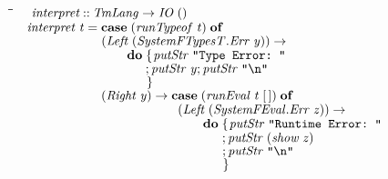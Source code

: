 \documentclass[10pt]{article}
\newlength{\lwidth}\setlength{\lwidth}{4.5cm}
\newlength{\cwidth}\setlength{\cwidth}{8mm} %
\newcommand{\Conid}[1]{\mathit{#1}}
\newcommand{\Varid}[1]{\mathit{#1}}
\begin{document}
\begin{tabbing}
\qquad\=\hspace{\lwidth}\=\hspace{\cwidth}\=\+\kill
${\hskip1.00em\relax\Varid{interpret}\mathbin{::}\Conid{TmLang}\to \Conid{IO}\;()}$\\
${\hskip1.00em\relax\Varid{interpret}\;\Varid{t}\mathrel{=}\mathbf{case}\;(\Varid{runTypeof}\;\Varid{t})\;\mathbf{of}}$\\
${\hskip1.00em\relax\phantom{\Varid{interpret}\;\Varid{t}\mathrel{=}\mbox{}}(\Conid{Left}\;(\Conid{\Conid{SystemFTypesT}.Err}\;\Varid{y}))\to }$\\
${\hskip1.00em\relax\phantom{\Varid{interpret}\;\Varid{t}\mathrel{=}\mbox{}}\hskip2.00em\relax\mathbf{do}\;\{\mskip1.5mu \Varid{putStr}\;\text{\tt \char34 Type~Error:~\char34}}$\\
${\hskip1.00em\relax\phantom{\Varid{interpret}\;\Varid{t}\mathrel{=}\mbox{}}\hskip2.00em\relax\phantom{\mathbf{do}\;\mbox{}};\Varid{putStr}\;\Varid{y};\Varid{putStr}\;\text{\tt \char34 \char92 n\char34}}$\\
${\hskip1.00em\relax\phantom{\Varid{interpret}\;\Varid{t}\mathrel{=}\mbox{}}\hskip2.00em\relax\phantom{\mathbf{do}\;\mbox{}}\mskip1.5mu\}}$\\
${\hskip1.00em\relax\phantom{\Varid{interpret}\;\Varid{t}\mathrel{=}\mbox{}}(\Conid{Right}\;\Varid{y})\to \mathbf{case}\;(\Varid{runEval}\;\Varid{t}\;[\mskip1.5mu \mskip1.5mu])\;\mathbf{of}}$\\
${\hskip1.00em\relax\phantom{\Varid{interpret}\;\Varid{t}\mathrel{=}\mbox{}}\hskip6.00em\relax(\Conid{Left}\;(\Conid{\Conid{SystemFEval}.Err}\;\Varid{z}))\to }$\\
${\hskip1.00em\relax\phantom{\Varid{interpret}\;\Varid{t}\mathrel{=}\mbox{}}\hskip6.00em\relax\hskip2.00em\relax\mathbf{do}\;\{\mskip1.5mu \Varid{putStr}\;\text{\tt \char34 Runtime~Error:~\char34}}$\\
${\hskip1.00em\relax\phantom{\Varid{interpret}\;\Varid{t}\mathrel{=}\mbox{}}\hskip6.00em\relax\hskip2.00em\relax\phantom{\mathbf{do}\;\mbox{}};\Varid{putStr}\;(\Varid{show}\;\Varid{z})}$\\
${\hskip1.00em\relax\phantom{\Varid{interpret}\;\Varid{t}\mathrel{=}\mbox{}}\hskip6.00em\relax\hskip2.00em\relax\phantom{\mathbf{do}\;\mbox{}};\Varid{putStr}\;\text{\tt \char34 \char92 n\char34}}$\\
${\hskip1.00em\relax\phantom{\Varid{interpret}\;\Varid{t}\mathrel{=}\mbox{}}\hskip6.00em\relax\hskip2.00em\relax\phantom{\mathbf{do}\;\mbox{}}\mskip1.5mu\}}$\\

\end{tabbing}
\end{document}
